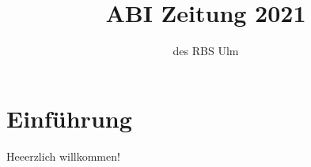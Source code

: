 \documentclass[a4paper]{article}
\begin{document}
\title{ABI Zeitung 2021}
\author{des RBS Ulm}

\maketitle


\section{Einführung}
Heeerzlich willkommen!



\end{document}
